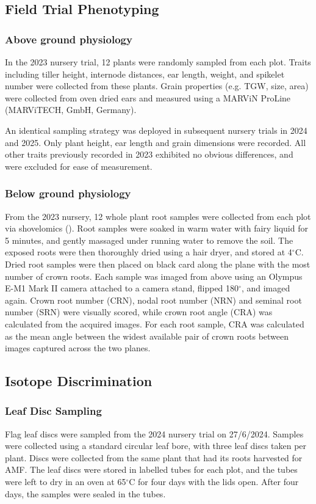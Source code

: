 \documentclass{article}
\begin{document}
\subsection{Field Trial Phenotyping}

\subsubsection{Above ground physiology}
In the 2023 nursery trial, 12 plants were randomly sampled from each plot. Traits including tiller height, internode distances, ear length, weight, and spikelet number were collected from these plants. Grain properties (e.g. TGW, size, area) were collected from oven dried ears and measured using a MARViN ProLine (MARViTECH, GmbH,
Germany).

An identical sampling strategy was deployed in subsequent nursery trials in 2024 and 2025. Only plant height, ear length and grain dimensions were recorded. All other traits previously recorded in 2023 exhibited no obvious differences, and were excluded for ease of measurement.

\subsubsection{Below ground physiology}
From the 2023 nursery, 12 whole plant root samples were collected from each plot via
shovelomics (\cite{fradgley_effects_2020}). Root samples were soaked in
warm water with fairy liquid for 5 minutes, and gently massaged under
running water to remove the soil. The exposed roots were then thoroughly dried
using a hair dryer, and stored at 4$^{\circ}$C. Dried root samples were then
placed on black card along the plane with the most number of crown roots.
Each sample was imaged from above using an Olympus E-M1 Mark II camera
attached to a camera stand, flipped 180$^{\circ}$, and imaged again. Crown root
number (CRN), nodal root number (NRN) and seminal root number (SRN) were
visually scored, while crown root angle (CRA) was calculated from the acquired
images. For each root sample, CRA was calculated as the mean angle between the
widest available pair of crown roots between images captured across the two planes.


\subsection{Isotope Discrimination}

\subsubsection{Leaf Disc Sampling}
Flag leaf discs were sampled from the 2024 nursery trial on 27/6/2024. Samples
were collected using a standard circular leaf bore, with three leaf discs
taken per plant. Discs were collected from the same plant that had its roots
harvested for AMF. The leaf discs were stored in labelled tubes for each
plot, and the tubes were left to dry in an oven at 65$^{\circ}$C for four days
with the lids open. After four days, the samples were sealed in the tubes.
\end{document}
